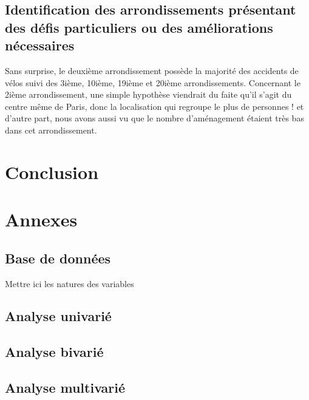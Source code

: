 \documentclass[french,]{compterendu}
\theoremstyle{urcastyle}
\theoremstyle{remark}
\begin{document}
\hypertarget{identification-des-arrondissements-pruxe9sentant-des-duxe9fis-particuliers-ou-des-amuxe9liorations-nuxe9cessaires}{%
\subsection{Identification des arrondissements présentant des défis particuliers ou des améliorations nécessaires}\label{identification-des-arrondissements-pruxe9sentant-des-duxe9fis-particuliers-ou-des-amuxe9liorations-nuxe9cessaires}}

Sans surprise, le deuxième arrondissement possède la majorité des accidents de vélos suivi des 3ième, 10ième, 19ième et 20ième arrondissements. Concernant le 2ième arrondissement, une simple hypothèse viendrait du faite qu'il s'agit du centre même de Paris, donc la localisation qui regroupe le plus de personnes ! et d'autre part, nous avons aussi vu que le nombre d'aménagement étaient très bas dans cet arrondissement.

\hypertarget{conclusion}{%
\section{Conclusion}\label{conclusion}}

\hypertarget{annexes}{%
\section{Annexes}\label{annexes}}

\hypertarget{base-de-donnuxe9es}{%
\subsection{Base de données}\label{base-de-donnuxe9es}}

Mettre ici les natures des variables

\hypertarget{analyse-univariuxe9}{%
\subsection{Analyse univarié}\label{analyse-univariuxe9}}

\hypertarget{analyse-bivariuxe9}{%
\subsection{Analyse bivarié}\label{analyse-bivariuxe9}}

\hypertarget{analyse-multivariuxe9}{%
\subsection{Analyse multivarié}\label{analyse-multivariuxe9}}
\end{document}
